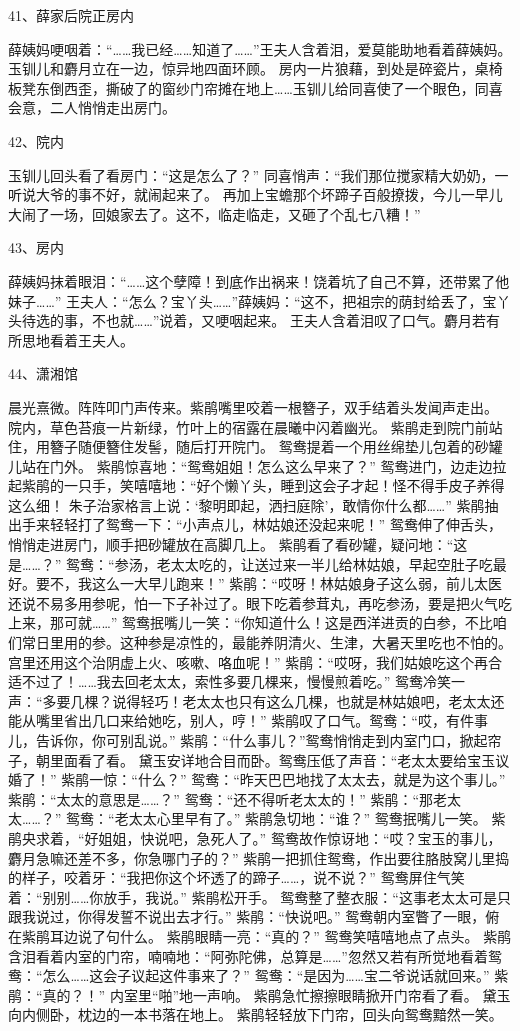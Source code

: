 41、薛家后院正房内\par
薛姨妈哽咽着：“……我已经……知道了……”王夫人含着泪，爱莫能助地看着薛姨妈。玉钏儿和麝月立在一边，惊异地四面环顾。 
房内一片狼藉，到处是碎瓷片，桌椅板凳东倒西歪，撕破了的窗纱门帘摊在地上……玉钏儿给同喜使了一个眼色，同喜会意，二人悄悄走出房门。 

42、院内\par 
玉钏儿回头看了看房门：“这是怎么了？” 同喜悄声：“我们那位搅家精大奶奶，一听说大爷的事不好，就闹起来了。
再加上宝蟾那个坏蹄子百般撩拨，今儿一早儿大闹了一场，回娘家去了。这不，临走临走，又砸了个乱七八糟！” 

43、房内\par 
薛姨妈抹着眼泪：“……这个孽障！到底作出祸来！饶着坑了自己不算，还带累了他妹子……” 
王夫人：“怎么？宝丫头……”薛姨妈：“这不，把祖宗的荫封给丢了，宝丫头待选的事，不也就……”说着，又哽咽起来。 
王夫人含着泪叹了口气。麝月若有所思地看着王夫人。 

44、潇湘馆\par
晨光熹微。阵阵叩门声传来。紫鹃嘴里咬着一根簪子，双手结着头发闻声走出。
院内，草色苔痕一片新绿，竹叶上的宿露在晨曦中闪着幽光。 
紫鹃走到院门前站住，用簪子随便簪住发髻，随后打开院门。 
鸳鸯提着一个用丝绵垫儿包着的砂罐儿站在门外。 
紫鹃惊喜地：“鸳鸯姐姐！怎么这么早来了？” 
鸳鸯进门，边走边拉起紫鹃的一只手，笑嘻嘻地：“好个懒丫头，睡到这会子才起！怪不得手皮子养得这么细！
朱子治家格言上说：‘黎明即起，洒扫庭除’，敢情你什么都……” 
紫鹃抽出手来轻轻打了鸳鸯一下：“小声点儿，林姑娘还没起来呢！” 
鸳鸯伸了伸舌头，悄悄走进房门，顺手把砂罐放在高脚几上。 
紫鹃看了看砂罐，疑问地：“这是……？” 
鸳鸯：“参汤，老太太吃的，让送过来一半儿给林姑娘，早起空肚子吃最好。要不，我这么一大早儿跑来！” 
紫鹃：“哎呀！林姑娘身子这么弱，前儿太医还说不易多用参呢，怕一下子补过了。眼下吃着参茸丸，再吃参汤，要是把火气吃上来，那可就……” 
鸳鸯抿嘴儿一笑：“你知道什么！这是西洋进贡的白参，不比咱们常日里用的参。这种参是凉性的，最能养阴清火、生津，大暑天里吃也不怕的。宫里还用这个治阴虚上火、咳嗽、咯血呢！” 
紫鹃：“哎呀，我们姑娘吃这个再合适不过了！……我去回老太太，索性多要几棵来，慢慢煎着吃。” 
鸳鸯冷笑一声：“多要几棵？说得轻巧！老太太也只有这么几棵，也就是林姑娘吧，老太太还能从嘴里省出几口来给她吃，别人，哼！” 
紫鹃叹了口气。鸳鸯：“哎，有件事儿，告诉你，你可别乱说。” 
紫鹃：“什么事儿？”鸳鸯悄悄走到内室门口，掀起帘子，朝里面看了看。 
黛玉安详地合目而卧。鸳鸯压低了声音：“老太太要给宝玉议婚了！” 
紫鹃一惊：“什么？” 鸳鸯：“昨天巴巴地找了太太去，就是为这个事儿。” 
紫鹃：“太太的意思是……？” 鸳鸯：“还不得听老太太的！” 
紫鹃：“那老太太……？” 鸳鸯：“老太太心里早有了。” 
紫鹃急切地：“谁？” 鸳鸯抿嘴儿一笑。 
紫鹃央求着，“好姐姐，快说吧，急死人了。” 
鸳鸯故作惊讶地：“哎？宝玉的事儿，麝月急嘛还差不多，你急哪门子的？” 
紫鹃一把抓住鸳鸯，作出要往胳肢窝儿里捣的样子，咬着牙：“我把你这个坏透了的蹄子……，说不说？” 
鸳鸯屏住气笑着：“别别……你放手，我说。” 紫鹃松开手。 
鸳鸯整了整衣服：“这事老太太可是只跟我说过，你得发誓不说出去才行。” 
紫鹃：“快说吧。” 鸳鸯朝内室瞥了一眼，俯在紫鹃耳边说了句什么。 
紫鹃眼睛一亮：“真的？” 鸳鸯笑嘻嘻地点了点头。 
紫鹃含泪看着内室的门帘，喃喃地：“阿弥陀佛，总算是……”忽然又若有所觉地看着鸳鸯：“怎么……这会子议起这件事来了？” 
鸳鸯：“是因为……宝二爷说话就回来。” 紫鹃：“真的？！” 
内室里“啪”地一声响。 紫鹃急忙擦擦眼睛掀开门帘看了看。 
黛玉向内侧卧，枕边的一本书落在地上。 紫鹃轻轻放下门帘，回头向鸳鸯黯然一笑。 

